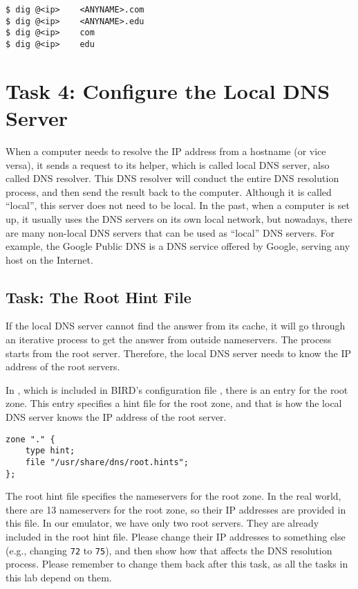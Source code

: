 \begin{lstlisting}
$ dig @<ip>    <ANYNAME>.com
$ dig @<ip>    <ANYNAME>.edu
$ dig @<ip>    com
$ dig @<ip>    edu
\end{lstlisting}


\section{Task 4: Configure the Local DNS Server} 


When a computer needs to resolve the IP address from a hostname (or vice versa),
it sends a request to its helper, which is called local DNS server, also
called DNS resolver. This DNS resolver will conduct the
entire DNS resolution process, and then send the result back to the computer.
Although it is called ``local'', this server does not need to be local.
In the past, when a computer is set up, it usually uses the DNS servers on its own
local network, but nowadays, there are many non-local DNS servers that can be used as
``local'' DNS servers. For example, the Google Public DNS
is a DNS service offered by Google, serving any host on the Internet.


\subsection{Task: The Root Hint File} 

If the local DNS server cannot find the answer from its cache, it
will go through an iterative process to get the answer from outside
nameservers.  The process starts from the root server.
Therefore, the local DNS server needs to
know the IP address of the root servers.


In , which is included
in BIRD's configuration file , there is an
entry for the root zone. This entry specifies a hint file for the
root zone, and that is how the local DNS server knows the IP address of the
root server.

\begin{lstlisting}
zone "." {
	type hint;
	file "/usr/share/dns/root.hints";
};
\end{lstlisting}

The root hint file specifies the nameservers for the
root zone. In the real world, there are 13 nameservers for the root zone, 
so their IP addresses are provided in this file. 
In our emulator, we have only two root servers. They are already included 
in the root hint file. Please change their IP addresses to something else (e.g.,
changing \texttt{72} to \texttt{75}),  and then show how  that affects
the DNS resolution process. Please remember to change them back after this task,
as all the tasks in this lab depend on them.

